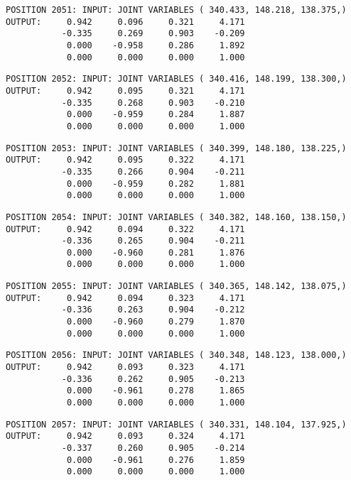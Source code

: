 \begin{verbatim}
POSITION 2051: INPUT: JOINT VARIABLES ( 340.433, 148.218, 138.375,)
OUTPUT:     0.942     0.096     0.321     4.171
           -0.335     0.269     0.903    -0.209
            0.000    -0.958     0.286     1.892
            0.000     0.000     0.000     1.000
\end{verbatim} \pagebreak[1]\begin{verbatim}
POSITION 2052: INPUT: JOINT VARIABLES ( 340.416, 148.199, 138.300,)
OUTPUT:     0.942     0.095     0.321     4.171
           -0.335     0.268     0.903    -0.210
            0.000    -0.959     0.284     1.887
            0.000     0.000     0.000     1.000
\end{verbatim} \pagebreak[1]\begin{verbatim}
POSITION 2053: INPUT: JOINT VARIABLES ( 340.399, 148.180, 138.225,)
OUTPUT:     0.942     0.095     0.322     4.171
           -0.335     0.266     0.904    -0.211
            0.000    -0.959     0.282     1.881
            0.000     0.000     0.000     1.000
\end{verbatim} \pagebreak[1]\begin{verbatim}
POSITION 2054: INPUT: JOINT VARIABLES ( 340.382, 148.160, 138.150,)
OUTPUT:     0.942     0.094     0.322     4.171
           -0.336     0.265     0.904    -0.211
            0.000    -0.960     0.281     1.876
            0.000     0.000     0.000     1.000
\end{verbatim} \pagebreak[1]\begin{verbatim}
POSITION 2055: INPUT: JOINT VARIABLES ( 340.365, 148.142, 138.075,)
OUTPUT:     0.942     0.094     0.323     4.171
           -0.336     0.263     0.904    -0.212
            0.000    -0.960     0.279     1.870
            0.000     0.000     0.000     1.000
\end{verbatim} \pagebreak[1]\begin{verbatim}
POSITION 2056: INPUT: JOINT VARIABLES ( 340.348, 148.123, 138.000,)
OUTPUT:     0.942     0.093     0.323     4.171
           -0.336     0.262     0.905    -0.213
            0.000    -0.961     0.278     1.865
            0.000     0.000     0.000     1.000
\end{verbatim} \pagebreak[1]\begin{verbatim}
POSITION 2057: INPUT: JOINT VARIABLES ( 340.331, 148.104, 137.925,)
OUTPUT:     0.942     0.093     0.324     4.171
           -0.337     0.260     0.905    -0.214
            0.000    -0.961     0.276     1.859
            0.000     0.000     0.000     1.000
\end{verbatim} \pagebreak[1]\begin{verbatim}

\end{verbatim}
